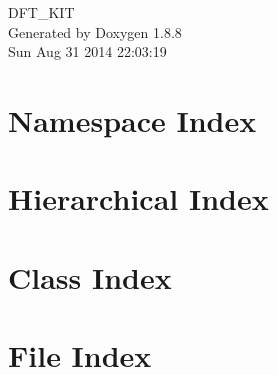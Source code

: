 \documentclass[twoside]{book}
\newcommand{\+}{\discretionary{\mbox{\scriptsize$\hookleftarrow$}}{}{}}
\newcommand{\clearemptydoublepage}{%
  \newpage{\pagestyle{empty}\cleardoublepage}%
}
\begin{document}
\hypersetup{pageanchor=false,
             bookmarks=true,
             bookmarksnumbered=true,
             pdfencoding=unicode
            }
\begin{titlepage}
\vspace*{7cm}
\begin{center}%
{\Large D\+F\+T\+\_\+\+K\+I\+T }\\
\vspace*{1cm}
{\large Generated by Doxygen 1.8.8}\\
\vspace*{0.5cm}
{\small Sun Aug 31 2014 22:03:19}\\
\end{center}
\end{titlepage}
\clearemptydoublepage
\tableofcontents
\clearemptydoublepage
{}
\hypersetup{pageanchor=true}

\chapter{Namespace Index}

\chapter{Hierarchical Index}

\chapter{Class Index}

\chapter{File Index}

\end{document}
